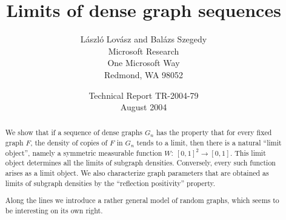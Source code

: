 \documentclass[fleqn]{article}
\begin{document}
\addtolength{\baselineskip}{3pt} \setlength{\oddsidemargin}{0.2in}

\def\R{{\mathbb R}}
\def\one{{\mathbf 1}}
\def\Q{{\mathbb Q}}
\def\Z{{\mathbb Z}}
\def\C{{\mathbb C}}
\def\N{{\mathbb N}}
\def\hom{{\rm hom}}
\def\Hom{{\rm Hom}}
\def\Inj{{\rm Inj}}
\def\Ind{{\rm Ind}}
\def\inj{{\rm inj}}
\def\ind{{\rm ind}}
\def\sur{{\rm sur}}
\def\PAG{{\rm PAG}}
\def\CUT{{\text{\rm CUT}}}
\def\eps{\varepsilon}
\long{}
\def\dd{{d_{\text{\rm set}}}}
\def\dl{{d_{\text{\rm left}}}}
\def\dr{{d_{\text{\rm right}}}}
\def\Ge{{\mathbf G}}

\def\ontop#1#2{\genfrac{}{}{0pt}{}{#1}{#2}}

\def\HH{{\cal H}}
\def\SS{{\cal S}}
\def\TT{{\cal T}}
\def\II{{\cal I}}
\def\FF{{\cal F}}
\def\GG{{\cal G}}
\def\AA{{\cal A}}
\def\MM{{\cal M}}
\def\EE{{\cal E}}
\def\LL{{\cal L}}
\def\PP{{\cal P}}
\def\CC{{\cal C}}
\def\SS{{\cal S}}
\def\QG{{\cal QG}}
\def\QGM{{\cal QGM}}
\def\CD{{\cal CD}}
\def\P{{\sf P}}
\def\E{{\sf E}}
\def\Var{{\sf Var}}
\def\T{^{\sf T}}


\def\tr{{\rm tr}}
\def\cost{\hbox{\rm cost}}
\def\val{\hbox{\rm val}}
\def\rk{{\rm rk}}
\def\diam{{\rm diam}}
\def\Ker{{\rm Ker}}

\title{\huge\bf Limits of dense graph sequences\\[12mm]}

\author{
{\sc L\'aszl\'o Lov\'asz} and
{\sc Bal\'azs Szegedy}\\[8mm]
Microsoft Research \\
One Microsoft Way\\
Redmond, WA 98052}


\date{Technical Report TR-2004-79\\
August 2004}

\maketitle

\tableofcontents

\begin{abstract}
We show that if a sequence of dense graphs $G_n$ has the property
that for every fixed graph $F$, the density of copies of $F$ in $G_n$
tends to a limit, then there is a natural ``limit object'', namely a
symmetric measurable function $W:~[0,1]^2\to[0,1]$. This limit object
determines all the limits of subgraph densities. Conversely, every
such function arises as a limit object. We also characterize graph
parameters that are obtained as limits of subgraph densities by the
``reflection positivity'' property.

Along the lines we introduce a rather general model of random graphs,
which seems to be interesting on its own right.
\end{abstract}
\end{document}
